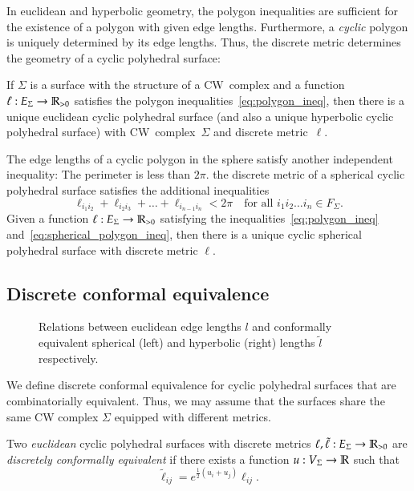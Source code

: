 \documentclass[Thesis.tex]{subfiles}
\begin{document}
In euclidean and hyperbolic geometry, the polygon inequalities are
sufficient for the existence of a polygon with given edge
lengths. Furthermore, a \emph{cyclic} polygon is uniquely determined
by its edge lengths. Thus, the discrete metric determines the geometry
of a cyclic polyhedral surface:

If $\Sigma$ is a surface with the structure of a CW~complex and a
function $\ell:E_{\Sigma}\rightarrow\mathbb R_{>0}$ satisfies the polygon
inequalities~\eqref{eq:polygon_ineq}, then there is a unique euclidean
cyclic polyhedral surface (and also a unique hyperbolic cyclic
polyhedral surface) with CW~complex~$\Sigma$ and discrete
metric~$\ell$.

The edge lengths of a cyclic polygon in the sphere satisfy another
independent inequality: The perimeter is less than $2\pi$.  the discrete metric of a
spherical cyclic polyhedral surface satisfies the additional
inequalities
\begin{equation}
\label{eq:spherical_polygon_ineq}
\ell_{i_{1}i_{2}}+\ell_{i_{2}i_{3}}+\ldots+\ell_{i_{n-1}i_{n}}
<2\pi
\quad
\text{for all $i_{1}i_{2}\ldots i_{n}\in F_{\Sigma}$.}
\end{equation}
Given a function $\ell:E_{\Sigma}\rightarrow\mathbb R_{>0}$ satisfying the
inequalities~\eqref{eq:polygon_ineq}
and~\eqref{eq:spherical_polygon_ineq}, then there is a unique cyclic
spherical polyhedral surface with discrete metric $\ell$.

\subsection{Discrete conformal equivalence}
\label{sec:discr-conf-equiv}

\begin{figure}
\centering
\resizebox{0.6\textwidth}{!}{


}
\caption{Relations between euclidean edge lengths $l$ and conformally equivalent spherical (left) and hyperbolic (right) lengths $\tilde l$ respectively.}
\label{fig:geometries}
\end{figure}


We define discrete conformal equivalence for cyclic polyhedral
surfaces that are combinatorially equivalent. Thus, we may assume that
the surfaces share the same CW complex $\Sigma$ equipped with
different metrics.

Two \emph{euclidean} cyclic polyhedral surfaces with
discrete metrics $\ell,\tilde\ell:E_{\Sigma}\rightarrow\mathbb R_{>0}$ are
\emph{discretely conformally equivalent} if there exists a function
$u:V_{\Sigma}\rightarrow\mathbb R$ such that
\begin{equation}
\label{eq:tilde_ell_euc}
\tilde\ell_\mathit{ij}=e^{\frac{1}{2}(u_{i}+u_{j})}\ell_\mathit{ij}.
\end{equation}
\end{document}
